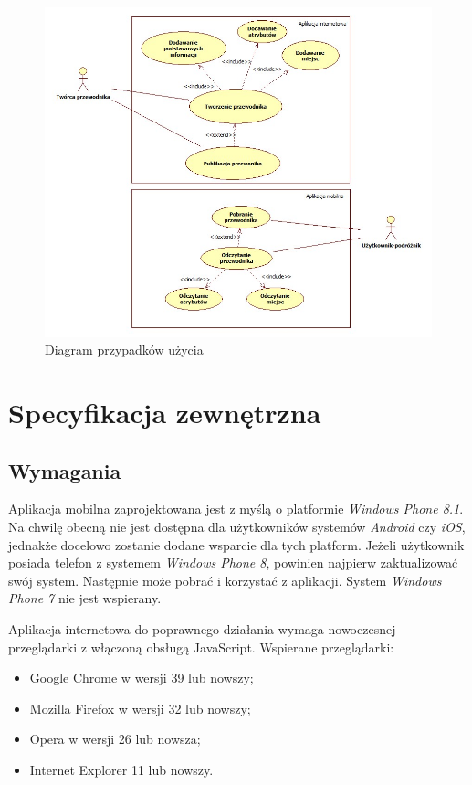\documentclass[a4paper]{book}
\begin{document}
		\begin{figure}		
			\centering
			\includegraphics[width=1.0\textwidth]{images/usecase.jpg}
			\caption{Diagram przypadków użycia}
			\label{fig:usecase}
		\end{figure}
		
		
	\chapter{Specyfikacja zewnętrzna}
	\label{id:cha:specyfikacja_zewnetrzna}
		\section{Wymagania}
		
		Aplikacja mobilna zaprojektowana jest z myślą o platformie \emph{Windows Phone 8.1}. Na chwilę obecną nie jest dostępna dla użytkowników systemów \emph{Android} czy \emph{iOS}, jednakże docelowo zostanie dodane wsparcie dla tych platform. Jeżeli użytkownik posiada telefon z systemem \emph{Windows Phone 8}, powinien najpierw zaktualizować swój system. Następnie może pobrać i korzystać z aplikacji. System \emph{Windows Phone 7} nie jest wspierany.
		
		Aplikacja internetowa do poprawnego działania wymaga nowoczesnej przeglądarki z włączoną obsługą JavaScript. Wspierane przeglądarki:
		\begin{itemize}
			\item Google Chrome w wersji 39 lub nowszy;
			\item Mozilla Firefox w wersji 32 lub nowszy;
			\item Opera w wersji 26 lub nowsza;
			\item Internet Explorer 11 lub nowszy.
		\end{itemize}
		
\end{document}
